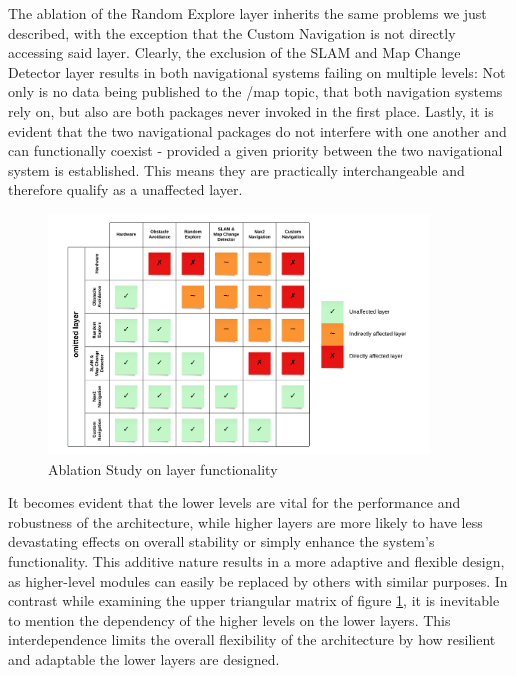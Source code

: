 \documentclass[]{article}
\begin{document}
	The ablation of the Random Explore layer inherits the same problems we just described, with the exception that the Custom Navigation is not directly accessing said layer. \newline
	Clearly, the exclusion of the SLAM and Map Change Detector layer results in both navigational systems failing on multiple levels: Not only is no data being published to the /map topic, that both navigation systems rely on, but also are both packages never invoked in the first place.  
	Lastly, it is evident that the two navigational packages do not interfere with one another and can functionally coexist - provided a given priority between the two navigational system is established. This means they are practically interchangeable and therefore qualify as a unaffected layer. 
	
	\newpage
	
	\begin{figure}[ht]
		\centering
		\includegraphics[width=0.9\textwidth]{Graphics/AblationStudy}
		\caption{Ablation Study on layer functionality}
		\label{fig: fig9}
	\end{figure}
	
	It becomes evident that the lower levels are vital for the performance and robustness of the architecture, while higher layers are more likely to have less devastating effects on overall stability or simply enhance the system's functionality. This additive nature results in a more adaptive and flexible design, as higher-level modules can easily be replaced by others with similar purposes. In contrast while examining the upper triangular matrix of figure \ref{fig: fig9}, it is inevitable to mention the dependency of the higher levels on the lower layers. This interdependence limits the overall flexibility of the architecture by how resilient and adaptable the lower layers are designed. 
	\newpage
	
\end{document}
